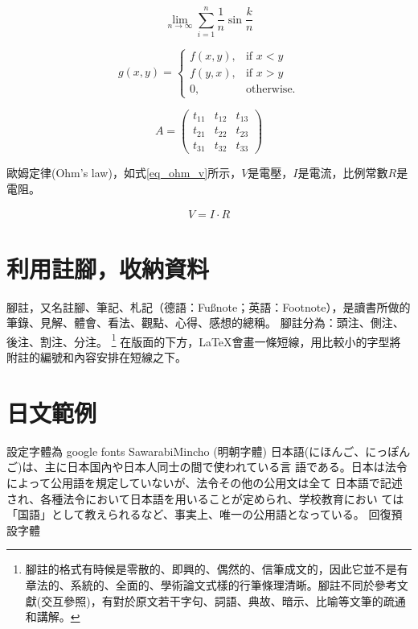 \begin{equation}
\lim_{n \to \infty}\sum_{i=1}^n{\frac{1}{n}}\sin\frac{k}{n}
\end{equation}

\begin{equation}
   g(x,y) = \left\{\begin{array}{ll}
      f(x,y), & \mbox{if $x<y$} \\  %
      f(y,x), & \mbox{if $x>y$} \\  %
      0,      & \mbox{otherwise.}
     \end{array} \right.
\end{equation}

\begin{equation}
   A =\begin{pmatrix}                %
  t_{11} & t_{12} & t_{13} \\
  t_{21} & t_{22} & t_{23} \\
  t_{31} & t_{32} & t_{33}
   \end{pmatrix}
\end{equation}
\vspace*{3em}

歐姆定律(Ohm's law)，如式\ref{eq_ohm_v}所示，$V$是電壓，$I$是電流，比例常數$R$是電阻。

\begin{equation}\label{eq_ohm_v}
    \begin{split}
        V = I \cdot R
    \end{split}
\end{equation}
\clearpage

\section{利用註腳，收納資料}
腳註，又名註腳、筆記、札記（德語：Fußnote；英語：Footnote），是讀書所做的筆錄、見解、體會、看法、觀點、心得、感想的總稱。
腳註分為：頭注、側注、後注、割注、分注。
\footnote{腳註的格式有時候是零散的、即興的、偶然的、信筆成文的，因此它並不是有章法的、系統的、全面的、學術論文式樣的行筆條理清晰。腳註不同於參考文獻(交互參照)，有對於原文若干字句、詞語、典故、暗示、比喻等文筆的疏通和講解。}
在版面的下方，\LaTeX 會畫一條短線，用比較小的字型將附註的編號和內容安排在短線之下。

\section{日文範例}
設定字體為 google fonts SawarabiMincho (明朝字體) \newline
\mincho
日本語(にほんご、にっぽんご)は、主に日本国內や日本人同士の間で使われている言
語である。日本は法令によって公用語を規定していないが、法令その他の公用文は全て
日本語で記述され、各種法令において日本語を用いることが定められ、学校教育におい
ては「国語」として教えられるなど、事実上、唯一の公用語となっている。
\rmfamily
\newline
回復預設字體


